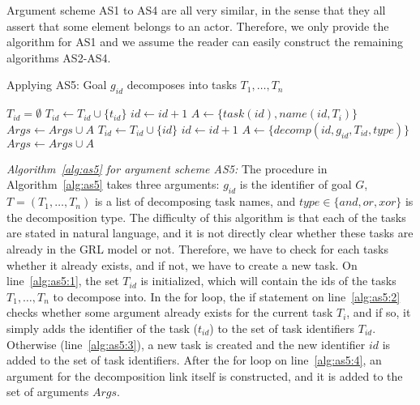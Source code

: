 Argument scheme AS1 to AS4 are all very similar, in the sense that they all assert that some element belongs to an actor. Therefore, we only provide the algorithm for AS1 and we assume the reader can easily construct the remaining algorithms AS2-AS4.

\begin{algorithm}[h]
  \caption{Applying AS5: Goal $g_{id}$ decomposes into tasks $T_1,\ldots,T_n$}\label{alg:as5}
  \begin{algorithmic}[1]
    \State $T_{id} = \emptyset$\label{alg:as5:1}
        \State $T_{id} \gets T_{id} \cup \{t_{id}\}$
      \Else\label{alg:as5:3}
        \State $id\gets id+1$
        \State $A \gets \{task(id),name(id,T_i)\}$
        \State $Args \gets Args\cup A$
        \State $T_{id} \gets T_{id} \cup \{id\}$
      \EndIf
    \EndFor
    \State $id\gets id+1$\label{alg:as5:4}
    \State $A\gets \{decomp(id, g_{id}, T_{id}, type)\}$
    \State $Args \gets Args\cup A$
    \EndProcedure
  \end{algorithmic}
\end{algorithm}

\emph{Algorithm~\ref{alg:as5} for argument scheme AS5:} The procedure in Algorithm~\ref{alg:as5} takes three arguments: $g_{id}$ is the identifier of goal $G$, $T=(T_1,\ldots,T_n)$ is a list of decomposing task names, and $type\in\{and,or,xor\}$ is the decomposition type. The difficulty of this algorithm is that each of the tasks are stated in natural language, and it is not directly clear whether these tasks are already in the GRL model or not. Therefore, we have to check for each tasks whether it already exists, and if not, we have to create a new task. On line~\ref{alg:as5:1}, the set $T_{id}$ is initialized, which will contain the ids of the tasks $T_1,\ldots,T_n$ to decompose into. In the for loop, the if statement on line~\ref{alg:as5:2} checks whether some argument already exists for the current task $T_i$, and if so, it simply adds the identifier of the task ($t_{id}$) to the set of task identifiers $T_{id}$. Otherwise (line~\ref{alg:as5:3}), a new task is created and the new identifier $id$ is added to the set of task identifiers. After the for loop on line~\ref{alg:as5:4}, an argument for the decomposition link itself is constructed, and it is added to the set of arguments $Args$.

